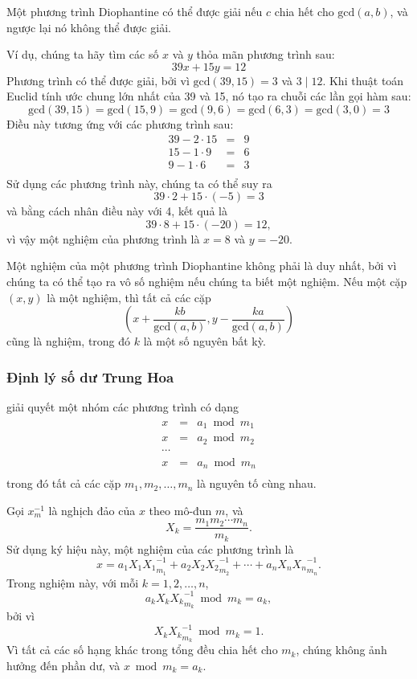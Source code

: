 Một phương trình Diophantine có thể được giải nếu
$c$ chia hết cho
$\textrm{gcd}(a,b)$,
và ngược lại nó không thể được giải.

Ví dụ, chúng ta hãy tìm các số $x$ và $y$
thỏa mãn phương trình sau:
\[
39x + 15y = 12
\]
Phương trình có thể được giải, bởi vì
$\textrm{gcd}(39,15)=3$ và $3 \mid 12$.
Khi thuật toán Euclid tính
ước chung lớn nhất của 39 và 15,
nó tạo ra chuỗi các lần gọi hàm sau:
\[
\textrm{gcd}(39,15) = \textrm{gcd}(15,9)
= \textrm{gcd}(9,6) = \textrm{gcd}(6,3)
= \textrm{gcd}(3,0) = 3 \]
Điều này tương ứng với các phương trình sau:
\[
\begin{array}{lcl}
39 - 2 \cdot 15 & = & 9 \\
15 - 1 \cdot 9 & = & 6 \\
9 - 1 \cdot 6 & = & 3 \\
\end{array}
\]
Sử dụng các phương trình này, chúng ta có thể suy ra
\[
39 \cdot 2 + 15 \cdot (-5) = 3
\]
và bằng cách nhân điều này với 4, kết quả là
\[
39 \cdot 8 + 15 \cdot (-20) = 12,
\]
vì vậy một nghiệm của phương trình là
$x=8$ và $y=-20$.

Một nghiệm của một phương trình Diophantine không phải là duy nhất,
bởi vì chúng ta có thể tạo ra vô số nghiệm
nếu chúng ta biết một nghiệm.
Nếu một cặp $(x,y)$ là một nghiệm, thì tất cả các cặp
\[(x+\frac{kb}{\textrm{gcd}(a,b)},y-\frac{ka}{\textrm{gcd}(a,b)})\]
cũng là nghiệm, trong đó $k$ là một số nguyên bất kỳ.

\subsubsection{Định lý số dư Trung Hoa}


 giải quyết
một nhóm các phương trình có dạng
\[
\begin{array}{lcl}
x & = & a_1 \bmod m_1 \\
x & = & a_2 \bmod m_2 \\
\cdots \\
x & = & a_n \bmod m_n \\
\end{array}
\]
trong đó tất cả các cặp $m_1,m_2,\ldots,m_n$ là nguyên tố cùng nhau.

Gọi $x^{-1}_m$ là nghịch đảo của $x$ theo mô-đun $m$, và
\[ X_k = \frac{m_1 m_2 \cdots m_n}{m_k}.\]
Sử dụng ký hiệu này, một nghiệm của các phương trình là
\[x = a_1 X_1 {X_1}^{-1}_{m_1} + a_2 X_2 {X_2}^{-1}_{m_2} + \cdots + a_n X_n {X_n}^{-1}_{m_n}.\]
Trong nghiệm này, với mỗi $k=1,2,\ldots,n$,
\[a_k X_k {X_k}^{-1}_{m_k} \bmod m_k = a_k,\]
bởi vì
\[X_k {X_k}^{-1}_{m_k} \bmod m_k = 1.\]
Vì tất cả các số hạng khác trong tổng đều chia hết cho $m_k$,
chúng không ảnh hưởng đến phần dư,
và $x \bmod m_k = a_k$.

